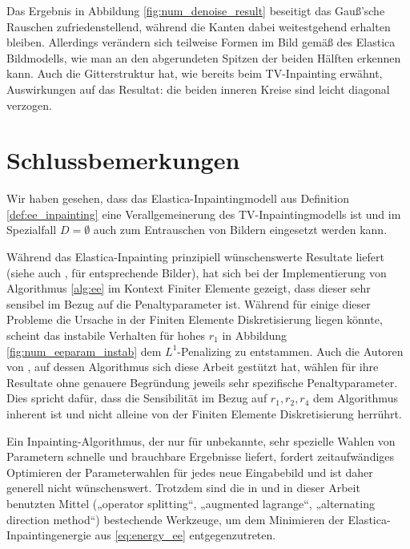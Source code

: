 \documentclass{mythesis}
\begin{document}
Das Ergebnis in Abbildung \ref{fig:num_denoise_result} beseitigt das Gauß'sche Rauschen zufriedenstellend, während die Kanten dabei weitestgehend erhalten bleiben.
Allerdings verändern sich teilweise Formen im Bild gemäß des Elastica Bildmodells, wie man an den abgerundeten Spitzen der beiden Hälften erkennen kann.
Auch die Gitterstruktur hat, wie bereits beim TV-Inpainting erwähnt, Auswirkungen auf das Resultat: die beiden inneren Kreise sind leicht diagonal verzogen.


\section{Schlussbemerkungen}


Wir haben gesehen, dass das Elastica-Inpaintingmodell aus Definition
\ref{def:ee_inpainting} eine Verallgemeinerung des TV-Inpaintingmodells ist und im
Spezialfall $D = \emptyset$ auch zum Entrauschen von Bildern eingesetzt werden
kann.

Während das Elastica-Inpainting prinzipiell wünschenswerte Resultate liefert (siehe auch \cite{shen2002euler}, \cite{tai2011fast} für entsprechende Bilder),
hat sich bei der Implementierung von Algorithmus \ref{alg:ee} im Kontext Finiter Elemente gezeigt, dass dieser sehr sensibel im Bezug auf die Penaltyparameter ist.
Während für einige dieser Probleme die Ursache in der Finiten Elemente Diskretisierung liegen könnte, scheint das instabile Verhalten für hohes $r_1$ in Abbildung \ref{fig:num_eeparam_instab} dem $L^1$-Penalizing zu entstammen.
Auch die Autoren von \cite{tai2011fast}, auf dessen Algorithmus sich diese Arbeit gestützt hat, wählen für ihre Resultate ohne genauere Begründung jeweils sehr spezifische Penaltyparameter.
Dies spricht dafür, dass die Sensibilität im Bezug auf $r_1, r_2, r_4$ dem Algorithmus inherent ist und nicht alleine von der Finiten Elemente Diskretisierung herrührt.

Ein Inpainting-Algorithmus, der nur für unbekannte, sehr spezielle Wahlen von Parametern schnelle und brauchbare Ergebnisse liefert, fordert zeitaufwändiges Optimieren der Parameterwahlen für jedes neue Eingabebild und ist daher generell nicht wünschenswert.
Trotzdem sind die in \cite{tai2011fast} und in dieser Arbeit benutzten Mittel („operator splitting“, „augmented lagrange“, „alternating direction method“) bestechende Werkzeuge, um dem Minimieren der Elastica-Inpaintingenergie aus \eqref{eq:energy_ee} entgegenzutreten.
\end{document}
